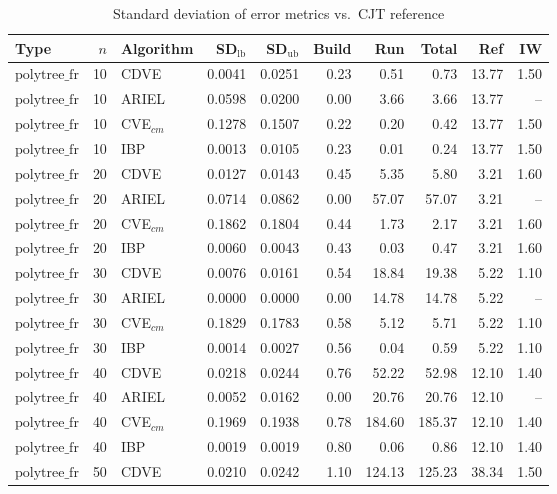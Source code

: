 \begin{table}[ht]
\centering
\scriptsize
\caption{Standard deviation of error metrics vs.\ CJT reference}
\begin{tabular}{lrlrrrrrrr}
\toprule
Type & $n$ & Algorithm & SD$_{\text{lb}}$ & SD$_{\text{ub}}$ & Build & Run & Total & Ref & IW \\
\midrule
$\text{polytree\_fr}$ & 10 & CDVE & 0.0041 & 0.0251 & 0.23 & 0.51 & 0.73 & 13.77 & 1.50 \\
$\text{polytree\_fr}$ & 10 & ARIEL & 0.0598 & 0.0200 & 0.00 & 3.66 & 3.66 & 13.77 & -- \\
$\text{polytree\_fr}$ & 10 & CVE$_{cm}$ & 0.1278 & 0.1507 & 0.22 & 0.20 & 0.42 & 13.77 & 1.50 \\
$\text{polytree\_fr}$ & 10 & IBP & 0.0013 & 0.0105 & 0.23 & 0.01 & 0.24 & 13.77 & 1.50 \\
\hline
$\text{polytree\_fr}$ & 20 & CDVE & 0.0127 & 0.0143 & 0.45 & 5.35 & 5.80 & 3.21 & 1.60 \\
$\text{polytree\_fr}$ & 20 & ARIEL & 0.0714 & 0.0862 & 0.00 & 57.07 & 57.07 & 3.21 & -- \\
$\text{polytree\_fr}$ & 20 & CVE$_{cm}$ & 0.1862 & 0.1804 & 0.44 & 1.73 & 2.17 & 3.21 & 1.60 \\
$\text{polytree\_fr}$ & 20 & IBP & 0.0060 & 0.0043 & 0.43 & 0.03 & 0.47 & 3.21 & 1.60 \\
\hline
$\text{polytree\_fr}$ & 30 & CDVE & 0.0076 & 0.0161 & 0.54 & 18.84 & 19.38 & 5.22 & 1.10 \\
$\text{polytree\_fr}$ & 30 & ARIEL & 0.0000 & 0.0000 & 0.00 & 14.78 & 14.78 & 5.22 & -- \\
$\text{polytree\_fr}$ & 30 & CVE$_{cm}$ & 0.1829 & 0.1783 & 0.58 & 5.12 & 5.71 & 5.22 & 1.10 \\
$\text{polytree\_fr}$ & 30 & IBP & 0.0014 & 0.0027 & 0.56 & 0.04 & 0.59 & 5.22 & 1.10 \\
\hline
$\text{polytree\_fr}$ & 40 & CDVE & 0.0218 & 0.0244 & 0.76 & 52.22 & 52.98 & 12.10 & 1.40 \\
$\text{polytree\_fr}$ & 40 & ARIEL & 0.0052 & 0.0162 & 0.00 & 20.76 & 20.76 & 12.10 & -- \\
$\text{polytree\_fr}$ & 40 & CVE$_{cm}$ & 0.1969 & 0.1938 & 0.78 & 184.60 & 185.37 & 12.10 & 1.40 \\
$\text{polytree\_fr}$ & 40 & IBP & 0.0019 & 0.0019 & 0.80 & 0.06 & 0.86 & 12.10 & 1.40 \\
\hline
$\text{polytree\_fr}$ & 50 & CDVE & 0.0210 & 0.0242 & 1.10 & 124.13 & 125.23 & 38.34 & 1.50 \\

\end{tabular}
\end{table}
